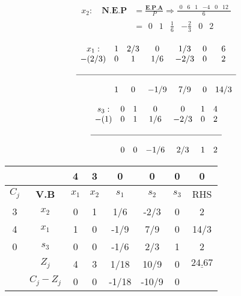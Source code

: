 \documentclass{templateNote}
\begin{document}
\begin{enumerate}
    \newpage
    \begin{align*}
        x_2: \quad \textbf{N.E.P} &= \frac{\textbf{E.P.A}}{P} \Rightarrow \frac{\begin{array}{cccccc} 0 & 6 & 1 & -4 & 0 & 12 \end{array}}{6} \\
        &= \begin{array}{cccccc} 0 & 1 & \frac{1}{6} & -\frac{2}{3} & 0 & 2 \end{array}
    \end{align*}

    \begin{equation*}
        \begin{array}{ccccccc}
            x_1: & 1 & 2/3 & 0 & 1/3 & 0 & 6 \\
            -(2/3) & 0 & 1 & 1/6 & -2/3 & 0 & 2\\
            \\ \hline \\
            & 1 & 0 & -1/9 & 7/9 & 0 & 14/3
        \end{array}
    \end{equation*}
    
    \begin{equation*}
        \begin{array}{ccccccc}
            s_3: & 0 & 1 & 0 & 0 & 1 & 4 \\
            -(1) & 0 & 1 & 1/6 & -2/3 & 0 & 2\\
            \\ \hline \\
            & 0 & 0 & -1/6 & 2/3 & 1 & 2
        \end{array}
    \end{equation*}
    
    \begin{center}
        \begin{tabular}{|c|c|c|c|c|c|c|c|}
            \hline
            & & 4 & 3 & 0 & 0 & 0 & 0 \\ \hline
            $C_j$ & \textbf{V.B} & $x_1$ & $x_2$ & $s_1$ & $s_2$ & $s_3$ & RHS \\ \hline
            3 & $x_2$ & 0 & 1 & 1/6 & -2/3 & 0 & \cellcolor{Celeste!50}2 \\
            4 & $x_1$ & 1 & 0 & -1/9 & 7/9 & 0 & \cellcolor{Morado!50}14/3 \\
            0 & $s_3$ & 0 & 0 & -1/6 & 2/3 & 1 & \cellcolor{green!50}2 \\ \hline
            & $Z_j$ & 4 & 3 & 1/18 & 10/9 & 0 & \cellcolor{Salmon!50}$\underline{24.67}$ \\ \hline
            & $C_j - Z_j$ & 0 & 0 & -1/18 & -10/9 & 0 & \\ \hline
        \end{tabular}
    \end{center}


\end{enumerate}
\end{document}
